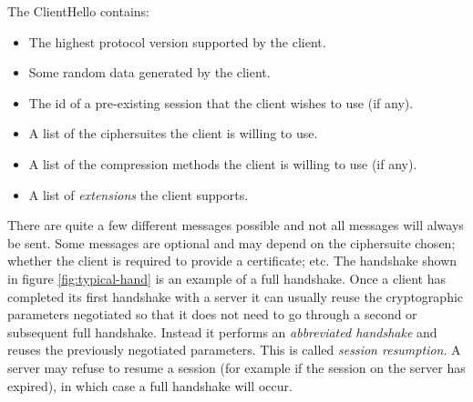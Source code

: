 The ClientHello contains:
\begin{itemize}
\item The highest protocol version supported by the client.
\item Some random data generated by the client.
\item The id of a pre-existing session that the client wishes to use (if any).
\item A list of the ciphersuites the client is willing to use.
\item A list of the compression methods the client is willing to use (if any).
\item A list of \emph{extensions} the client supports.
\end{itemize}

There are quite a few different messages possible and not all messages will 
always be sent. Some messages are optional and may depend on the ciphersuite 
chosen; whether the client is required to provide a certificate; etc. The 
handshake shown in figure \ref{fig:typical-hand} is an example of a full 
handshake. Once a client has completed its first handshake with a server it can 
usually reuse the cryptographic parameters negotiated so that it does not need 
to go through a second or subsequent full handshake. Instead it performs an 
\emph{abbreviated handshake} and reuses the previously negotiated parameters. 
This is called \emph{session resumption}. A server may refuse to resume a 
session (for example if the session on the server has expired), in which case a 
full handshake will occur.
